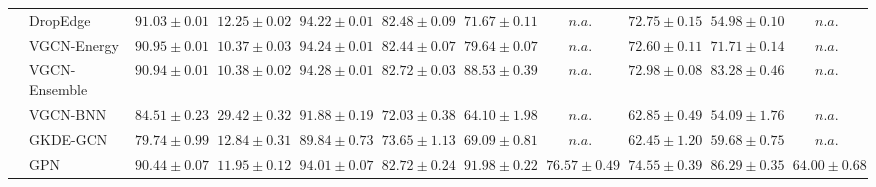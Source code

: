\begin{table*}[!h]
{\begin{tabular}{ll|cc|cccc|ccc}
        & DropEdge & ${91.03\scriptscriptstyle \pm 0.01}$ & ${12.25\scriptscriptstyle \pm 0.02}$ & ${94.22\scriptscriptstyle \pm 0.01}$ & ${82.48\scriptscriptstyle \pm 0.09}$ & ${71.67\scriptscriptstyle \pm 0.11}$ & $n.a.$ & ${72.75\scriptscriptstyle \pm 0.15}$ & ${54.98\scriptscriptstyle \pm 0.10}$ & $n.a.$\\
        & VGCN-Energy & ${90.95\scriptscriptstyle \pm 0.01}$ & ${10.37\scriptscriptstyle \pm 0.03}$ & ${94.24\scriptscriptstyle \pm 0.01}$ & ${82.44\scriptscriptstyle \pm 0.07}$ & ${79.64\scriptscriptstyle \pm 0.07}$ & $n.a.$ & ${72.60\scriptscriptstyle \pm 0.11}$ & ${71.71\scriptscriptstyle \pm 0.14}$ & $n.a.$\\
        & VGCN-Ensemble & ${90.94\scriptscriptstyle \pm 0.01}$ & ${10.38\scriptscriptstyle \pm 0.02}$ & ${94.28\scriptscriptstyle \pm 0.01}$ & ${82.72\scriptscriptstyle \pm 0.03}$ & ${88.53\scriptscriptstyle \pm 0.39}$ & $n.a.$ & ${72.98\scriptscriptstyle \pm 0.08}$ & ${83.28\scriptscriptstyle \pm 0.46}$ & $n.a.$\\
        & VGCN-BNN & ${84.51\scriptscriptstyle \pm 0.23}$ & ${29.42\scriptscriptstyle \pm 0.32}$ & ${91.88\scriptscriptstyle \pm 0.19}$ & ${72.03\scriptscriptstyle \pm 0.38}$ & ${64.10\scriptscriptstyle \pm 1.98}$ & $n.a.$ & ${62.85\scriptscriptstyle \pm 0.49}$ & ${54.09\scriptscriptstyle \pm 1.76}$ & $n.a.$\\
        & GKDE-GCN & ${79.74\scriptscriptstyle \pm 0.99}$ & ${12.84\scriptscriptstyle \pm 0.31}$ & ${89.84\scriptscriptstyle \pm 0.73}$ & ${73.65\scriptscriptstyle \pm 1.13}$ & ${69.09\scriptscriptstyle \pm 0.81}$ & $n.a.$ & ${62.45\scriptscriptstyle \pm 1.20}$ & ${59.68\scriptscriptstyle \pm 0.75}$ & $n.a.$\\
        & GPN & ${90.44\scriptscriptstyle \pm 0.07}$ & ${11.95\scriptscriptstyle \pm 0.12}$ & ${94.01\scriptscriptstyle \pm 0.07}$ & ${82.72\scriptscriptstyle \pm 0.24}$ & ${{91.98}\scriptscriptstyle \pm 0.22}$ & ${76.57\scriptscriptstyle \pm 0.49}$ & ${74.55\scriptscriptstyle \pm 0.39}$ & ${{86.29}\scriptscriptstyle \pm 0.35}$ & ${64.00\scriptscriptstyle \pm 0.68}$\\


\end{tabular}}
\end{table*}
